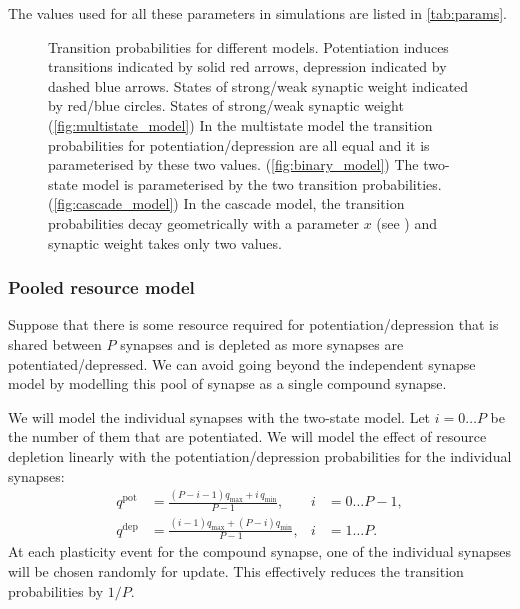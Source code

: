 \documentclass[12pt]{article}
\newcommand{\pot}{^{\text{pot}}}
\newcommand{\dep}{^{\text{dep}}}
\newcommand{\lmax}{_{\text{max}}}
\newcommand{\lmin}{_{\text{min}}}
\begin{document}
The values used for all these parameters in simulations are listed in \autoref{tab:params}.

\begin{figure}
 \begin{center}
 \begin{myenuma}
  \item{}\label{fig:multistate_model}\hspace{0.5cm}
  \item{}\label{fig:binary_model}\hspace{0.5cm}
  \item{}\label{fig:cascade_model}
 \end{myenuma}
 \end{center}
  \caption[Transition probabilities for different models]{Transition probabilities for different models.
  Potentiation induces transitions indicated by solid red arrows, depression indicated by dashed blue arrows.
  States of strong/weak synaptic weight indicated by red/blue circles.
  States of strong/weak synaptic weight
  (\ref{fig:multistate_model}) In the multistate model the transition probabilities for potentiation/depression are all equal and it is parameterised by these two values.
  (\ref{fig:binary_model}) The two-state model is parameterised by the two transition probabilities.
  (\ref{fig:cascade_model}) In the cascade model, the transition probabilities decay geometrically with a parameter $x$ (see \cite{Fusi2005cascade}) and synaptic weight takes only two values.
  } \label{fig:models}
\end{figure}

\subsubsection{Pooled resource model}\label{sec:pooledmodel}

Suppose that there is some resource required for potentiation/depression that is shared between $P$ synapses and is depleted as more synapses are potentiated/depressed.
We can avoid going beyond the independent synapse model by modelling this pool of synapse as a single compound synapse.

We will model the individual synapses with the two-state model.
Let $i=0\ldots P$ be the number of them that are potentiated.
We will model the effect of resource depletion linearly with the potentiation/depression probabilities for the individual synapses:
%
\begin{equation}\label{eq:depletion}
  \begin{aligned}
    q\pot &= \frac{(P-i-1)q\lmax + i\,q\lmin}{P-1}, \quad& i &= 0 \ldots P-1,\\
    q\dep &= \frac{(i-1)q\lmax + (P-i)q\lmin}{P-1}, & i &= 1 \ldots P.
  \end{aligned}
\end{equation}
%
At each plasticity event for the compound synapse, one of the individual synapses will be chosen randomly for update.
This effectively reduces the transition probabilities by $1/P$.
\end{document}
